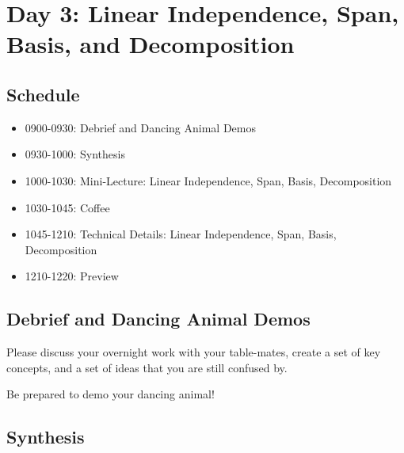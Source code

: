 \chapter{Day 3: Linear Independence, Span, Basis, and Decomposition}

\section{Schedule}
\begin{itemize}
\item 0900-0930: Debrief and Dancing Animal Demos
\item 0930-1000: Synthesis 
\item 1000-1030: Mini-Lecture: Linear Independence, Span, Basis, Decomposition
\item 1030-1045: Coffee
\item 1045-1210: Technical Details: Linear Independence, Span, Basis, Decomposition
\item 1210-1220: Preview
\end{itemize}

\section{Debrief and Dancing Animal Demos}

\bi
\item Please discuss your overnight work with your table-mates, create a set of key concepts, and a set of ideas that you are still confused by.
\item Be prepared to demo your dancing animal!
\ei

\section{Synthesis}


